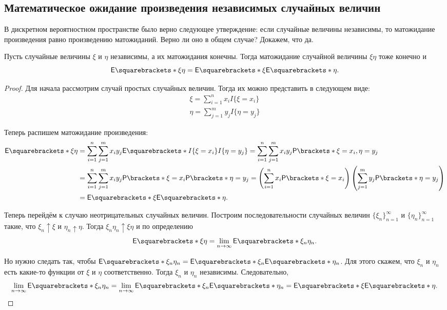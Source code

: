 \subsection{Математическое ожидание произведения независимых случайных величин}
В дискретном вероятностном пространстве было верно следующее утверждение: если случайные величины независимы, то матожидание произведения равно произведению матожиданий. Верно ли оно в общем случае? Докажем, что да.
\begin{theorem}
	Пусть случайные величины \(\xi\) и \(\eta\) независимы, а их матожидания конечны. Тогда матожидание случайной величины \(\xi\eta\) тоже конечно и
	\[
	\E{\xi\eta} = \E{\xi}\E{\eta}.
	\]
\end{theorem}
\begin{proof}
	Для начала рассмотрим случай простых случайных величин. Тогда их можно представить в следующем виде:
	\begin{align}
		\xi = \sum\limits_{i = 1}^{n} x_{i}I\{\xi = x_{i}\} \\
		\eta = \sum\limits_{j = 1}^{m} y_{j}I\{\eta = y_{j}\}
	\end{align}
	
	Теперь распишем матожидание произведения:
	\begin{align}
		\E{\xi\eta} &= \sum_{i = 1}^{n}\sum_{j = 1}^{m} x_{i}y_{j}\E{I\{\xi = x_{i}\}I\{\eta = y_{j}\}} = \sum_{i = 1}^{n}\sum_{j = 1}^{m} x_{i}y_{j}\Pr{\xi = x_{i}, \eta = y_{j}} \\
		&= \sum_{i = 1}^{n}\sum_{j = 1}^{m} x_{i}y_{j}\Pr{\xi = x_{i}}\Pr{\eta = y_{j}} = \left(\sum_{i = 1}^{n} x_{i}\Pr{\xi = x_{i}}\right)\left(\sum_{j = 1}^{m} y_{j}\Pr{\eta = y_{j}}\right) \\
		&= \E{\xi}\E{\eta}.
	\end{align}
	
	Теперь перейдём к случаю неотрицательных случайных величин. Построим последовательности случайных величин \(\{\xi_n\}_{n = 1}^{\infty}\) и \(\{\eta_n\}_{n = 1}^{\infty}\) такие, что \(\xi_n \uparrow \xi\) и \(\eta_n \uparrow \eta\). Тогда \(\xi_n\eta_n \uparrow \xi\eta\) и по определению
	\[
	\E{\xi\eta} = \lim\limits_{n \to \infty} \E{\xi_n \eta_n}.
	\]
	
	Но нужно следать так, чтобы \(\E{\xi_n \eta_n} = \E{\xi_n} \E{\eta_n}\). Для этого скажем, что \(\xi_n\) и \(\eta_n\) есть какие-то функции от \(\xi\) и \(\eta\) соответственно. Тогда  \(\xi_n\) и \(\eta_n\) независимы. Следовательно,
	\[
	\lim\limits_{n \to \infty} \E{\xi_n \eta_n} = \lim\limits_{n \to \infty} \E{\xi_n} \E{\eta_n} = \E{\xi} \E{\eta}.
	\]
	

\end{proof}
